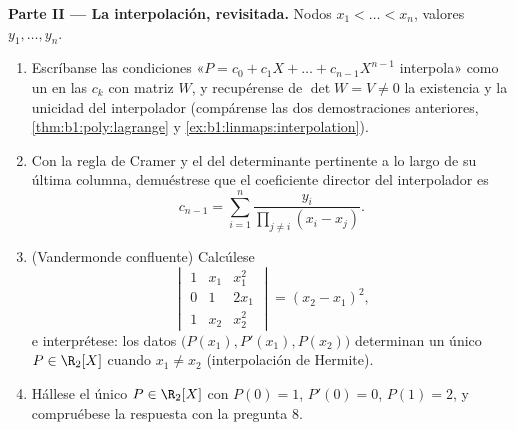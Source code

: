 \begin{problem}
\medskip
\noindent\textbf{Parte II --- La interpolación, revisitada.} Nodos
$x_1 < \dots < x_n$, valores $y_1, \dots, y_n$.
\begin{enumerate}[resume]
  \item Escríbanse las condiciones «$P = c_0 + c_1X + \dots +
        c_{n-1}X^{n-1}$ interpola» como un  en las
        $c_k$ con matriz $W$, y recupérense de $\det W = V \neq 0$
        la existencia y la unicidad del interpolador (compárense las
        dos demostraciones anteriores,
        \cref{thm:b1:poly:lagrange} y
        \cref{ex:b1:linmaps:interpolation}).
  \item Con la regla de Cramer y el  del
        determinante pertinente a lo largo de su última columna,
        demuéstrese que el coeficiente director del interpolador es
        \[
        c_{n-1} = \sum_{i=1}^{n}
        \frac{y_i}{\prod_{j \neq i}(x_i - x_j)} .
        \]
  \item (Vandermonde confluente) Calcúlese
        \[
        \begin{vmatrix}
        1 & x_1 & x_1^2\\
        0 & 1 & 2x_1\\
        1 & x_2 & x_2^2
        \end{vmatrix}
        = (x_2 - x_1)^2 ,
        \]
        e interprétese: los datos
        $\bigl(P(x_1), P'(x_1), P(x_2)\bigr)$ determinan un único
        $P \in \R_2[X]$ cuando $x_1 \neq x_2$ (interpolación de
        Hermite).
  \item Hállese el único $P \in \R_2[X]$ con $P(0) = 1$, $P'(0)
        = 0$, $P(1) = 2$, y compruébese la respuesta con la
        pregunta 8.
\end{enumerate}


\end{problem}
